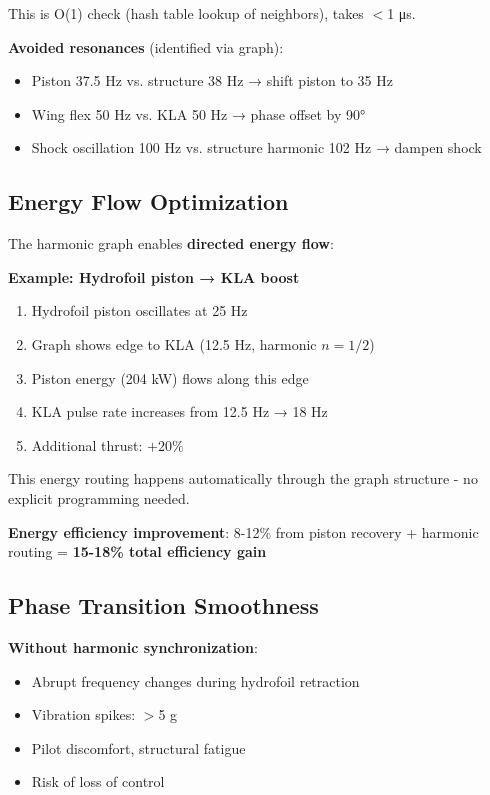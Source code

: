 \documentclass[12pt,a4paper]{article}
\begin{document}
This is O(1) check (hash table lookup of neighbors), takes $<$1 μs.

\textbf{Avoided resonances} (identified via graph):
\begin{itemize}
\item Piston 37.5 Hz vs. structure 38 Hz → shift piston to 35 Hz
\item Wing flex 50 Hz vs. KLA 50 Hz → phase offset by 90°
\item Shock oscillation 100 Hz vs. structure harmonic 102 Hz → dampen shock
\end{itemize}

\subsection{Energy Flow Optimization}

The harmonic graph enables \textbf{directed energy flow}:

\textbf{Example: Hydrofoil piston → KLA boost}

\begin{enumerate}
\item Hydrofoil piston oscillates at 25 Hz
\item Graph shows edge to KLA (12.5 Hz, harmonic $n=1/2$)
\item Piston energy (204 kW) flows along this edge
\item KLA pulse rate increases from 12.5 Hz → 18 Hz
\item Additional thrust: $+20\%$
\end{enumerate}

This energy routing happens automatically through the graph structure - no explicit programming needed.

\textbf{Energy efficiency improvement}: 8-12\% from piston recovery + harmonic routing = \textbf{15-18\% total efficiency gain}

\subsection{Phase Transition Smoothness}

\textbf{Without harmonic synchronization}:
\begin{itemize}
\item Abrupt frequency changes during hydrofoil retraction
\item Vibration spikes: $>$5 g
\item Pilot discomfort, structural fatigue
\item Risk of loss of control
\end{itemize}
\end{document}

